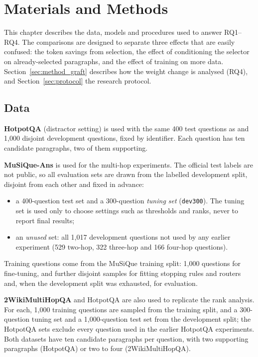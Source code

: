 \chapter{Materials and Methods}
\label{chap:method}

This chapter describes the data, models and procedures used to answer RQ1--RQ4. The comparisons are designed to separate three effects that are easily confused: the token savings from selection, the effect of conditioning the selector on already-selected paragraphs, and the effect of training on more data. Section~\ref{sec:method_graft} describes how the weight change is analysed (RQ4), and Section~\ref{sec:protocol} the research protocol.

\section{Data}
\label{sec:method_data}

\textbf{HotpotQA} \cite{yang2018hotpotqa} (distractor setting) is used with the same 400 test questions as  and 1,000 disjoint development questions, fixed by identifier. Each question has ten candidate paragraphs, two of them supporting.

\textbf{MuSiQue-Ans} \cite{trivedi2022musique} is used for the multi-hop experiments. The official test labels are not public, so all evaluation sets are drawn from the labelled development split, disjoint from each other and fixed in advance:
\begin{itemize}
  \item a 400-question test set and a 300-question \emph{tuning set} (\texttt{dev300}). The tuning set is used only to choose settings such as thresholds and ranks, never to report final results;
  \item an \emph{unused} set: all 1,017 development questions not used by any earlier experiment (529 two-hop, 322 three-hop and 166 four-hop questions).
\end{itemize}
Training questions come from the MuSiQue training split: 1,000 questions for fine-tuning, and further disjoint samples for fitting stopping rules and routers and, when the development split was exhausted, for evaluation.

\textbf{2WikiMultiHopQA} \cite{ho2020twowiki} and HotpotQA are also used to replicate the rank analysis. For each, 1,000 training questions are sampled from the training split, and a 300-question tuning set and a 1,000-question test set from the development split; the HotpotQA sets exclude every question used in the earlier HotpotQA experiments. Both datasets have ten candidate paragraphs per question, with two supporting paragraphs (HotpotQA) or two to four (2WikiMultiHopQA).

